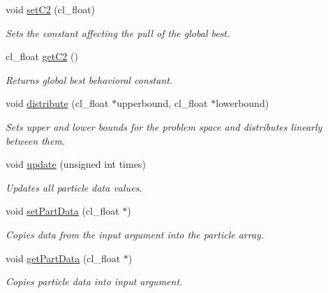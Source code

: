 \begin{DoxyCompactItemize}
\mbox{\label{classclSwarm_a2c5d28480a9ca6b8feab76e353ec02de}} 
void \mbox{\hyperlink{classclSwarm_a2c5d28480a9ca6b8feab76e353ec02de}{set\+C2}} (cl\+\_\+float)
\begin{DoxyCompactList}\small\item\em Sets the constant affecting the pull of the global best. \end{DoxyCompactList}\item 
\mbox{\label{classclSwarm_a08eafb666ba0f3de91b918e8a55f02ca}} 
cl\+\_\+float \mbox{\hyperlink{classclSwarm_a08eafb666ba0f3de91b918e8a55f02ca}{get\+C2}} ()
\begin{DoxyCompactList}\small\item\em Returns global best behavioral constant. \end{DoxyCompactList}\item 
void \mbox{\hyperlink{classclSwarm_a404f5c648630225042eed1b741f02997}{distribute}} (cl\+\_\+float $\ast$upperbound, cl\+\_\+float $\ast$lowerbound)
\begin{DoxyCompactList}\small\item\em Sets upper and lower bounds for the problem space and distributes linearly between them. \end{DoxyCompactList}\item 
void \mbox{\hyperlink{classclSwarm_a189bdd39fc8333496c2c96b6944bd995}{update}} (unsigned int times)
\begin{DoxyCompactList}\small\item\em Updates all particle data values. \end{DoxyCompactList}\item 
\mbox{\label{classclSwarm_acc5aabef84d730bb1922d465f55530ce}} 
void \mbox{\hyperlink{classclSwarm_acc5aabef84d730bb1922d465f55530ce}{set\+Part\+Data}} (cl\+\_\+float $\ast$)
\begin{DoxyCompactList}\small\item\em Copies data from the input argument into the particle array. \end{DoxyCompactList}\item 
\mbox{\label{classclSwarm_ae22ee6daedd9c1f47d9db3368e286558}} 
void \mbox{\hyperlink{classclSwarm_ae22ee6daedd9c1f47d9db3368e286558}{get\+Part\+Data}} (cl\+\_\+float $\ast$)
\begin{DoxyCompactList}\small\item\em Copies particle data into input argument. \end{DoxyCompactList}\item 

\end{DoxyCompactItemize}
